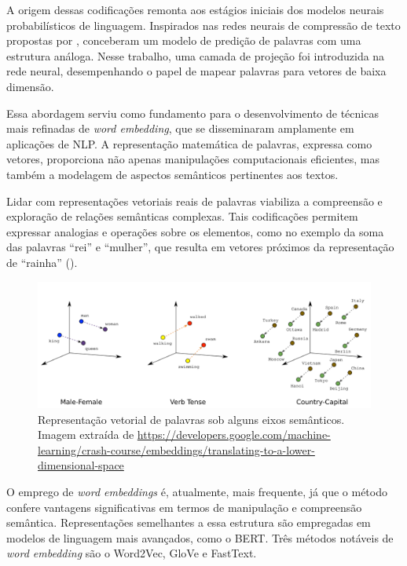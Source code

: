 A origem dessas codificações remonta aos estágios iniciais dos modelos neurais probabilísticos de linguagem. Inspirados nas redes neurais de compressão de texto propostas por \citet{schmidhuber-heil-1996}, \citet{bengio-et-al-2003} conceberam um modelo de predição de palavras com uma estrutura análoga. Nesse trabalho, uma camada de projeção foi introduzida na rede neural, desempenhando o papel de mapear palavras para vetores de baixa dimensão.

Essa abordagem serviu como fundamento para o desenvolvimento de técnicas mais refinadas de \textit{word embedding}, que se disseminaram amplamente em aplicações de NLP. A representação matemática de palavras, expressa como vetores, proporciona não apenas manipulações computacionais eficientes, mas também a modelagem de aspectos semânticos pertinentes aos textos.

Lidar com representações vetoriais reais de palavras viabiliza a compreensão e exploração de relações semânticas complexas. Tais codificações permitem expressar analogias e operações sobre os elementos, como no exemplo da soma das palavras ``rei'' e ``mulher'', que resulta em vetores próximos da representação de ``rainha'' (\cite{mikolov-etal-2013-linguistic}).

\begin{figure}[ht]
    \centering
    \includegraphics[width=\textwidth]{../figuras/wordembeddings.png}
    \caption{Representação vetorial de palavras sob alguns eixos semânticos. Imagem extraída de \url{https://developers.google.com/machine-learning/crash-course/embeddings/translating-to-a-lower-dimensional-space}}
    \label{fig:word_embeddings}
\end{figure}

O emprego de \textit{word embeddings} é, atualmente, mais frequente, já que o método confere vantagens significativas em termos de manipulação e compreensão semântica. Representações semelhantes a essa estrutura são empregadas em modelos de linguagem mais avançados, como o BERT. Três métodos notáveis de \textit{word embedding} são o Word2Vec, GloVe e FastText.

